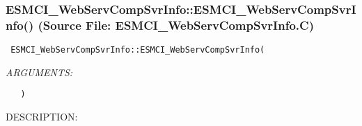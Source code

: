  
\setlength{\oldparskip}{\parskip}
\setlength{\parskip}{1.5ex}
\setlength{\oldparindent}{\parindent}
\setlength{\parindent}{0pt}
\setlength{\oldbaselineskip}{\baselineskip}
\setlength{\baselineskip}{11pt}
 
\def\bv{\begin{verbatim}}
\def\ev{\end{verbatim}}
\def\be{\begin{equation}}
\def\ee{\end{equation}}
\def\bea{\begin{eqnarray}}
\def\eea{\end{eqnarray}}
\def\bi{\begin{itemize}}
\def\ei{\end{itemize}}
\def\bn{\begin{enumerate}}
\def\en{\end{enumerate}}
\def\bd{\begin{description}}
\def\ed{\end{description}}
\def\({\left (}
\def\){\right )}
\def\[{\left [}
\def\]{\right ]}
\def\<{\left  \langle}
\def\>{\right \rangle}
\def\cI{{\cal I}}
\def\diag{\mathop{\rm diag}}
\def\tr{\mathop{\rm tr}}


 
\subsubsection{ESMCI\_WebServCompSvrInfo::ESMCI\_WebServCompSvrInfo() (Source File: ESMCI\_WebServCompSvrInfo.C)}


  
\begin{verbatim} ESMCI_WebServCompSvrInfo::ESMCI_WebServCompSvrInfo(\end{verbatim}{\em ARGUMENTS:}
\begin{verbatim}   )\end{verbatim}
{\sf DESCRIPTION:\\ }


